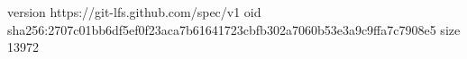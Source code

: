 version https://git-lfs.github.com/spec/v1
oid sha256:2707c01bb6df5ef0f23aca7b61641723cbfb302a7060b53e3a9c9ffa7c7908e5
size 13972
